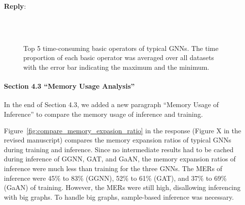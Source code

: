 \documentclass[12pt]{article}
\newenvironment{reply}
   {\medskip \noindent \textbf{Reply}:\  }
   {\medskip}
\begin{document}
\begin{reply}
\begin{figure}[H]
         \\
         \\
         
         \caption{Top 5 time-consuming basic operators of typical GNNs. The time proportion of each basic operator was averaged over all datasets with the error bar indicating the maximum and the minimum.}
         \label{fig:compare_top_time_consuming_basic_operators}
         
    \end{figure}
    
    \paragraph{Section 4.3 ``Memory Usage Analysis''}
         
     In the end of Section 4.3, we added a new paragraph ``Memory Usage of Inference'' to compare the memory usage of inference and training.
     
     Figure~\ref{fig:compare_memory_expasion_ratio} in the response (Figure X in the revised manuscript) compares the memory expansion ratios of typical GNNs during training and inference.
     Since no intermediate results had to be cached during inference of GGNN, GAT, and GaAN, the memory expansion ratios of inference were much less than training for the three GNNs.
     The MERs of inference were 45\% to 83\% (GGNN), 52\% to 61\% (GAT), and 37\% to 69\% (GaAN) of training.
     However, the MERs were still high, disallowing inferencing with big graphs.
     To handle big graphs, sample-based inference was necessary.
     

\end{reply}
\end{document}
